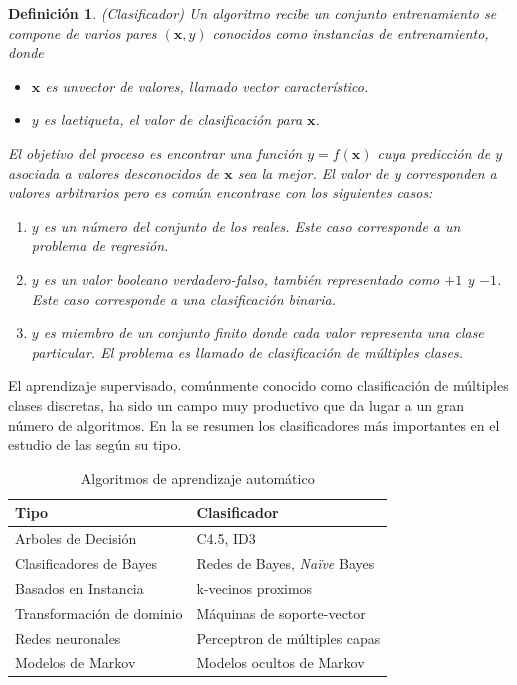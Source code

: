 \label{def3:clasificacion}\newtheorem{defs}{Definición}
\begin{defs}(Clasificador) Un algoritmo recibe un conjunto entrenamiento se compone de varios pares $(\boldsymbol{x},y)$ conocidos como instancias de entrenamiento, donde
\begin{itemize}
\item $\boldsymbol{x}$ es un\emph{vector} de valores, llamado vector característico.
\item $y$ es la\emph{etiqueta}, el valor de clasificación para $\boldsymbol{x}$.
\end{itemize}
El objetivo del proceso es encontrar una función $y=f(\boldsymbol{x})$ cuya predicción de $y$ asociada a valores desconocidos de $\boldsymbol{x}$ sea la mejor. El valor de y corresponden a valores arbitrarios pero es común encontrase con los siguientes casos:
\begin{enumerate}
\item $y$ es un número del conjunto de los reales. Este caso corresponde a un problema de regresión.
\item $y$ es un valor booleano verdadero-falso, también representado como $+1$ y $-1$. Este caso corresponde a una clasificación binaria. 
\item $y$ es miembro de un conjunto finito donde cada valor representa una clase particular. El problema es llamado de clasificación de múltiples clases.
\end{enumerate}
\end{defs}

El aprendizaje supervisado, comúnmente conocido como clasificación de múltiples clases discretas, ha sido un campo muy productivo que da lugar a un gran número de algoritmos. En la  se resumen los clasificadores más importantes en el estudio de las  según su tipo.
\begin{table}
\begin{centering}
\begin{tabular}{|l|l|}
\hline 
		Tipo 						& Clasificador							\\
\hline 
\hline 
		Arboles de Decisión 		& C4.5, ID3								\\
\hline 
		Clasificadores de Bayes 	& Redes de Bayes, \emph{Naïve} Bayes	\\
\hline 
		Basados en Instancia 		& k-vecinos proximos					\\
\hline 
		Transformación de dominio 	& Máquinas de soporte-vector			\\
\hline 
		Redes neuronales 			& Perceptron de múltiples capas			\\
\hline 
		Modelos de Markov 			& Modelos ocultos de Markov				\\
\hline
\end{tabular}
\par\end{centering}
\caption[Algoritmos de ]{\label{tab3:clasificadores} Algoritmos de aprendizaje automático}
\end{table}


